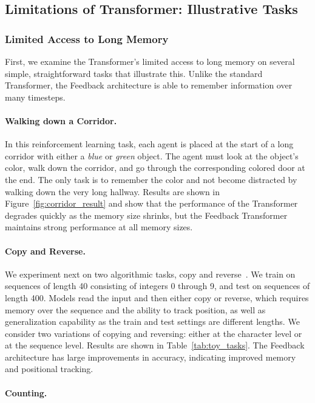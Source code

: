 \documentclass{article} \usepackage{iclr2021_conference}
\begin{document}
\subsection{Limitations of Transformer: Illustrative Tasks}

\subsubsection{Limited Access to Long Memory}

First, we examine the Transformer's limited access to long memory on several simple, straightforward tasks that illustrate this. Unlike the standard Transformer, the Feedback architecture is able to remember information over many timesteps. 

\paragraph{Walking down a Corridor.}

In this reinforcement learning task, each agent is placed at the start of a long corridor with either a \textit{blue} or \textit{green} object. The agent must look at the object's color, walk down the corridor, and go through the corresponding colored door at the end. The only task is to remember the color and not become distracted by walking down the very long hallway. Results are shown in Figure~\ref{fig:corridor_result} and show that the performance of the Transformer degrades quickly as the memory size shrinks, but the Feedback Transformer maintains strong performance at all memory sizes. 

\paragraph{Copy and Reverse.}
We experiment next on two algorithmic tasks, copy and reverse~\citep{kaiser2015neural}.
We train on sequences of length 40 consisting of integers 0 through 9, and test on sequences of length 400. 
Models read the input and then either copy or reverse, which requires memory over the sequence and the ability to track position, as well as generalization capability as the train and test settings are different lengths. 
We consider two variations of copying and reversing: either at the character level or at the sequence level. 
Results are shown in Table~\ref{tab:toy_tasks}. 
The Feedback architecture has large improvements in accuracy, indicating improved memory and positional tracking.

\paragraph{Counting.}
\end{document}
